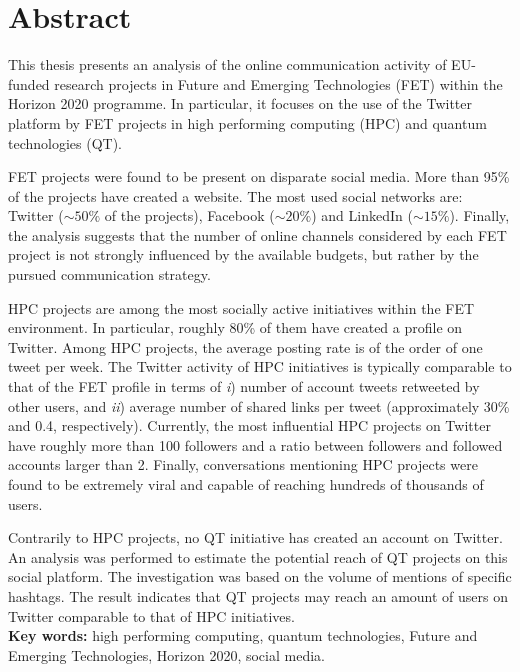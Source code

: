 \chapter*{Abstract}
This thesis presents an analysis of the online communication activity of EU-funded research projects in Future and Emerging Technologies (FET) within the Horizon 2020 programme. In particular, it focuses on the use of the Twitter platform by FET projects in high performing computing (HPC) and quantum technologies (QT).

FET projects were found to be present on disparate social media. More than 95\% of the projects have created a website. The most used social networks are: Twitter ($\sim 50\%$ of the projects), Facebook ($\sim 20\%$) and LinkedIn ($\sim 15\%$). Finally, the analysis suggests that the number of online channels considered by each FET project is not strongly influenced by the available budgets, but rather by the pursued communication strategy.

HPC projects are among the most socially active initiatives within the FET environment. In particular, roughly 80\% of them have created a profile on Twitter. Among HPC projects, the average posting rate is of the order of one tweet per week. The Twitter activity of HPC initiatives is typically comparable to that of the FET profile in terms of \textit{i}) number of account tweets retweeted by other users, and \textit{ii}) average number of shared links per tweet (approximately 30\% and 0.4, respectively). Currently, the most influential HPC projects on Twitter have roughly more than 100 followers and a ratio between followers and followed accounts larger than 2. Finally, conversations mentioning HPC projects were found to be extremely viral and capable of reaching hundreds of thousands of users.

Contrarily to HPC projects, no QT initiative has created an account on Twitter. An analysis was performed to estimate the potential reach of QT projects on this social platform. The investigation was based on the volume of mentions of specific hashtags. The result indicates that QT projects may reach an amount of users on Twitter comparable to that of HPC initiatives. \\

\noindent
\textbf{Key words:} high performing computing, quantum technologies, Future and Emerging Technologies, Horizon 2020, social media.